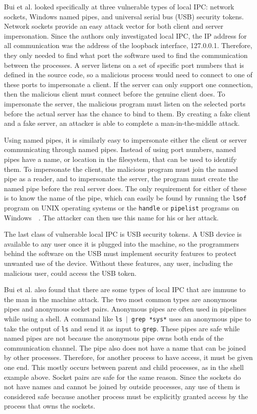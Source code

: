 Bui et al. looked specifically at three vulnerable types of local IPC: network sockets, Windows named pipes, and universal serial bus (USB) security tokens.  Network sockets provide an easy attack vector for both client and server impersonation.  Since the authors only investigated local IPC, the IP address for all communication was the address of the loopback interface, 127.0.0.1.  Therefore, they only needed to find what port the software used to find the communication between the processes.  A server listens on a set of specific port numbers that is defined in the source code, so a malicious process would need to connect to one of these ports to impersonate a client.  If the server can only support one connection, then the malicious client must connect before the genuine client does.  To impersonate the server, the malicious program must listen on the selected ports before the actual server has the chance to bind to them.  By creating a fake client and a fake server, an attacker is able to complete a man-in-the-middle attack.

Using named pipes, it is similarly easy to impersonate either the client or server communicating through named pipes.  Instead of using port numbers, named pipes have a name, or location in the filesystem, that can be used to identify them.  To impersonate the client, the malicious program must join the named pipe as a reader, and to impersonate the server, the program must create the named pipe before the real server does.  The only requirement for either of these is to know the name of the pipe, which can easily be found by running the \texttt{lsof} program on UNIX operating systems or the \texttt{handle} or \texttt{pipelist} programs on Windows~\cite{russinovich_2018}~\cite{markruss_sharkey_2016}.  The attacker can then use this name for his or her attack.

The last class of vulnerable local IPC is USB security tokens.  A USB device is available to any user once it is plugged into the machine, so the programmers behind the software on the USB must implement security features to protect unwanted use of the device.  Without these features, any user, including the malicious user, could access the USB token.

Bui et al. also found that there are some types of local IPC that are immune to the man in the machine attack.  The two most common types are anonymous pipes and anonymous socket pairs.  Anonymous pipes are often used in pipelines while using a shell.  A command like \texttt{ls $|$ grep *sys*} uses an anonymous pipe to take the output of \texttt{ls} and send it as input to \texttt{grep}.  These pipes are safe while named pipes are not because the anonymous pipe owns both ends of the communication channel.  The pipe also does not have a name that can be joined by other processes.  Therefore, for another process to have access, it must be given one end.  This mostly occurs between parent and child processes, as in the shell example above.  Socket pairs are safe for the same reason.  Since the sockets do not have names and cannot be joined by outside processes, any use of them is considered safe because another process must be explicitly granted access by the process that owns the sockets.

